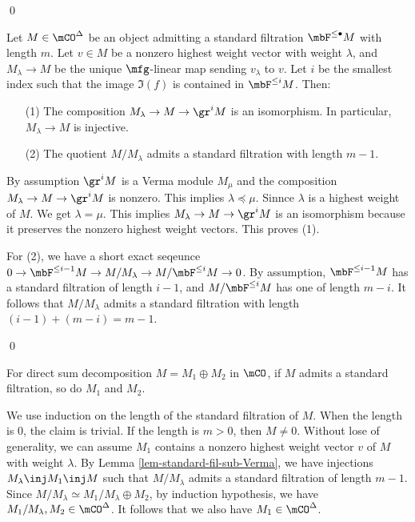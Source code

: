 	\qed

	\begin{lem}
		\label{lem-standard-fil-sub-Verma}
		 Let $M\in \mCO^\Delta$ be an object admitting a standard filtration $\mbF^{\le \bullet}M$ with length $m$. Let $v\in M$ be a nonzero highest weight vector with weight $\lambda$, and $M_\lambda \to M$ be the unique $\mfg$-linear map sending $v_\lambda$ to $v$. Let $i$ be the smallest index such that the image $\Im(f)$ is contained in $\mbF^{\le i}M$. Then:
		\begin{itemize}
			\item[(1)]
				The composition $M_\lambda \to M \to \gr^i M$ is an isomorphism. In particular, $M_\lambda \to M$ is injective.
			\item[(2)]
				The quotient $M/M_\lambda$ admits a standard filtration with length $m-1$.
		\end{itemize}
	\end{lem}

	\proof
		By assumption $\gr^i M$ is a Verma module $M_\mu$ and the composition $M_\lambda \to M \to \gr^i M$ is nonzero. This implies $\lambda\preceq \mu$. Sinnce $\lambda$ is a highest weight of $M$. We get $\lambda= \mu$. This implies $M_\lambda \to M \to \gr^i M$ is an isomorphism because it preserves the nonzero highest weight vectors. This proves (1).

		For (2), we have a short exact seqeunce $0 \to \mbF^{\le i-1} M \to M/M_\lambda \to M/\mbF^{\le i}M \to 0$. By assumption, $\mbF^{\le i-1} M$ has a standard filtration of length $i-1$, and $M/\mbF^{\le i}M $ has one of length $m-i$. It follows that $M/M_\lambda$ admits a standard filtration with length $(i-1)+(m-i)=m-1$.

	\qed

	\begin{lem}
		\label{lem-direct-summand-standard-fil}
		For direct sum decomposition $M=M_1\oplus M_2$ in $\mCO$, if $M$ admits a standard filtration, so do $M_1$ and $M_2$.
	\end{lem}

	\proof
		We use induction on the length of the standard filtration of $M$. When the length is $0$, the claim is trivial. If the length is $m>0$, then $M\neq 0$. Without lose of generality, we can assume $M_1$ contains a nonzero highest weight vector $v$ of $M$ with weight $\lambda$. By Lemma \ref{lem-standard-fil-sub-Verma}, we have injections $M_\lambda \inj M_1 \inj M$ such that $M/M_\lambda$ admits a standard filtration of length $m-1$. Since $M/M_\lambda \simeq M_1/M_\lambda \oplus M_2$, by induction hypothesis, we have $M_1/M_\lambda, M_2\in \mCO^\Delta$. It follows that we also have $M_1\in \mCO^\Delta$.

